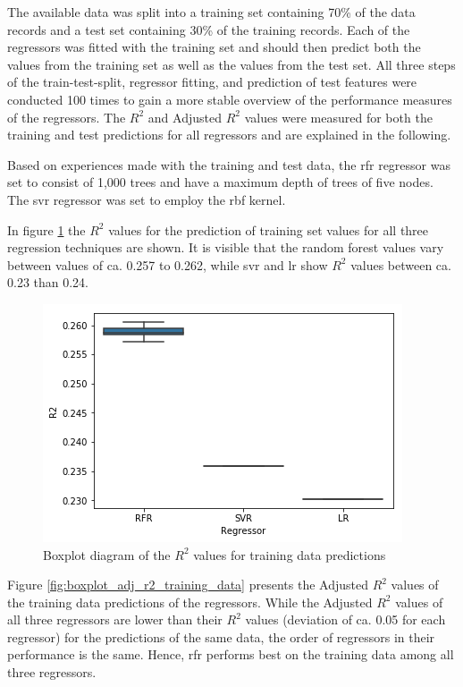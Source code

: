 \documentclass[a4paper, 11pt, oneside]{Thesis}  %
\begin{document}
The available data was split into a training set containing 70\% of the data records and a test set containing 30\% of the training records. Each of the regressors was fitted with the training set and should then predict both the values from the training set as well as the values from the test set. All three steps of the train-test-split, regressor fitting, and prediction of test features were conducted 100 times to gain a more stable overview of the performance measures of the regressors. The $R^2$ and Adjusted $R^2$ values were measured for both the training and test predictions for all regressors and are explained in the following.

Based on experiences made with the training and test data, the \ac{rfr} regressor was set to consist of 1,000 trees and have a maximum depth of trees of five nodes. The \ac{svr} regressor was set to employ the \ac{rbf} kernel.

In figure \ref{fig:boxplot_r2_training_data} the $R^2$ values for the prediction of training set values for all three regression techniques are shown. It is visible that the random forest values vary between values of ca. 0.257 to 0.262, while \ac{svr} and \ac{lr} show $R^2$ values between ca. 0.23 than 0.24.

\begin{figure}[h]
\includegraphics[scale=0.7]{Figures/Regressor_comparison/boxplot_r2_training_data.png}
\centering
\caption{Boxplot diagram of the $R^2$ values for training data predictions}
\label{fig:boxplot_r2_training_data}
\end{figure}

Figure \ref{fig:boxplot_adj_r2_training_data} presents the Adjusted $R^2$ values of the training data predictions of the regressors. While the Adjusted $R^2$  values of all three regressors are lower than their $R^2$ values (deviation of ca. 0.05 for each regressor) for the predictions of the same data, the order of regressors in their performance is the same. Hence, \ac{rfr} performs best on the training data among all three regressors.
\end{document}

